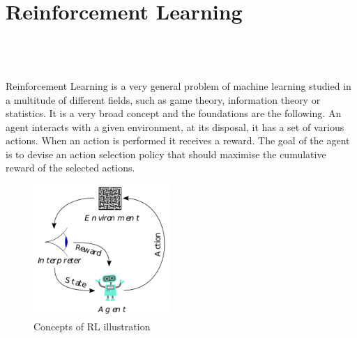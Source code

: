 
\setcounter{chapter}{1}

\chapter{Reinforcement Learning}
\mbox{}\\
\mbox{}\\
\mbox{}\\
Reinforcement Learning \cite{kaelbling1996reinforcement} is a very general problem of machine learning studied in a multitude of different fields, such as game theory, information theory or statistics. It is a very broad concept and the foundations are the following. An agent interacts with a given environment, at its disposal, it has a set of various actions. When an action is performed it receives a reward. The goal of the agent is to devise an action selection policy that should maximise the cumulative reward of the selected actions. 

\begin{figure}[h]
	\begin{center}
		\includegraphics*[height=5cm]{figures/rl_broad.png}
		\caption{ Concepts of RL illustration \protect\cite{wiki:rl}}	
	\end{center}
\end{figure}

